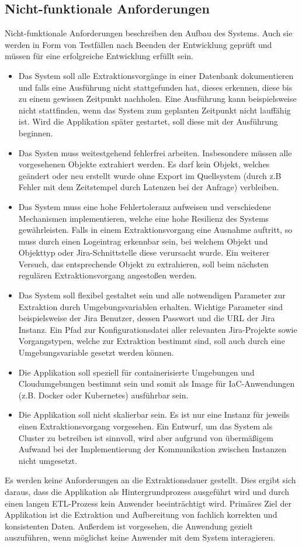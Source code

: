 \subsection{Nicht-funktionale Anforderungen}
Nicht-funktionale Anforderungen beschreiben den Aufbau des Systems. Auch sie werden in Form von Testfällen nach Beenden der Entwicklung geprüft und müssen für eine erfolgreiche Entwicklung erfüllt sein.\\
\begin{itemize}
\item Das System soll alle Extraktionsvorgänge in einer Datenbank dokumentieren und falls eine Ausführung nicht stattgefunden hat, dieses erkennen, diese bis zu einem gewissen Zeitpunkt nachholen. Eine Ausführung kann beispielsweise nicht stattfinden, wenn das System zum geplanten Zeitpunkt nicht lauffähig ist. Wird die Applikation später gestartet, soll diese mit der Ausführung beginnen.
\item Das Systen muss weitestgehend fehlerfrei arbeiten. Insbesondere müssen alle vorgesehenen Objekte extrahiert werden. Es darf kein Objekt, welches geändert oder neu erstellt wurde ohne Export im Quellsystem (durch z.B Fehler mit dem Zeitstempel durch Latenzen bei der Anfrage) verbleiben.
\item Das System muss eine hohe Fehlertoleranz aufweisen und verschiedene Mechanismen implementieren, welche eine hohe Resilienz des Systems gewährleisten. Falls in einem Extraktionsvorgang eine Ausnahme auftritt, so muss durch einen Logeintrag erkennbar sein, bei welchem Objekt und Objekttyp oder Jira-Schnittstelle diese verursacht wurde. Ein weiterer Versuch, das entsprechende Objekt zu extrahieren, soll beim nächsten regulären Extraktionsvorgang angestoßen werden.
\item Das System soll flexibel gestaltet sein und alle notwendigen Parameter zur Extraktion durch Umgebungsvariablen erhalten. Wichtige Parameter sind beispielsweise der Jira Benutzer, dessen Passwort und die URL der Jira Instanz. Ein Pfad zur Konfigurationsdatei aller relevanten Jira-Projekte sowie Vorgangstypen, welche zur Extraktion bestimmt sind, soll auch durch eine Umgebungsvariable gesetzt werden können.
\item Die Applikation soll speziell für containerisierte Umgebungen und Cloudumgebungen bestimmt sein und somit als Image für IaC-Anwendungen (z.B. Docker oder Kubernetes) ausführbar sein.
\item Die Applikation soll nicht skalierbar sein. Es ist nur eine Instanz für jeweils einen Extraktionsvorgang vorgesehen. Ein Entwurf, um das System als Cluster zu betreiben ist sinnvoll, wird aber aufgrund von übermäßigem Aufwand bei der Implementierung der Kommunikation zwischen Instanzen nicht umgesetzt.
\end{itemize}
Es werden keine Anforderungen an die Extraktionsdauer gestellt. Dies ergibt sich daraus, dass die Applikation als Hintergrundprozess ausgeführt wird und durch einen langen ETL-Prozess kein Anwender beeinträchtigt wird. Primäres Ziel der Applikation ist die Extraktion und Aufbereitung von fachlich korrekten und konsistenten Daten. Außerdem ist vorgesehen, die Anwendung gezielt auszuführen, wenn möglichst keine Anwender mit dem System interagieren.
